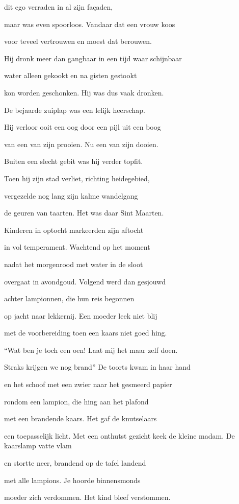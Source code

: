 dit ego verraden
in al zijn façaden,

maar was even spoorloos.
Vandaar dat een vrouw koos

voor teveel vertrouwen
en moest dat berouwen.

Hij dronk meer dan gangbaar
in een tijd waar schijnbaar

water alleen gekookt
en na gisten gestookt

kon worden geschonken.
Hij was dus vaak dronken.

De bejaarde zuiplap
was een lelijk heerschap.

Hij verloor ooit een oog
door een pijl uit een boog

van een van zijn prooien.
Nu een van zijn dooien.

Buiten een slecht gebit
was hij verder topfit.

Toen hij zijn stad verliet,
richting heidegebied,

vergezelde nog lang
zijn kalme wandelgang

de geuren van taarten.
Het was daar Sint Maarten.

Kinderen in optocht
markeerden zijn aftocht

in vol temperament.
Wachtend op het moment

nadat het morgenrood
met water in de sloot

overgaat in avondgoud.
Volgend werd dan gesjouwd

achter lampionnen,
die hun reis begonnen

op jacht naar lekkernij.
Een moeder leek niet blij

met de voorbereiding
toen een kaars niet goed hing.

“Wat ben je toch een oen!
Laat mij het maar zelf doen.

Straks krijgen we nog brand”
De toorts kwam in haar hand

en het schoof met een zwier
naar het gesmeerd papier

rondom een lampion,
die hing aan het plafond

met een brandende kaars.
Het gaf de knutselaars

een toepasselijk licht.
Met een onthutst gezicht
keek de kleine madam.
De kaarslamp vatte vlam

en stortte neer, brandend
op de tafel landend

met alle lampions.
Je hoorde binnensmonds

moeder zich verdommen.
Het kind bleef verstommen.

